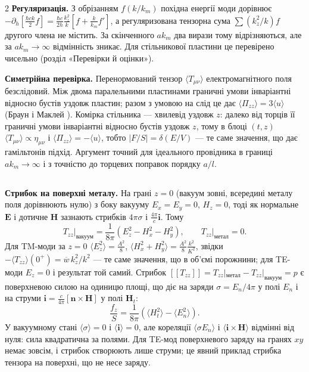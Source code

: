 \documentclass[twoside, 10pt]{article}
\def\myvspacebeforesubsection{-2.0mm}
\def\myvspaceaftersubsection{-2.5mm}
\begin{document}
\begin{multicols}{2}
\textbf{Регуляризація.} З обрізанням \(f(k/k_m)\) похідна енергії моди дорівнює
\(-\partial_h\!\left[\frac{\hbar ck}{2}f\right]=\frac{\hbar c}{2h}\frac{k_z^2}{k}\left[f+\frac{k}{k_m}f'\right]\),
а регуляризована тензорна сума \(\sum(k_z^2/k)f\) другого члена не містить. За скінченного
\(ak_m\) два вирази тому відрізняються, але за \(ak_m\to\infty\) відмінність зникає. Для
стільникової пластини це перевірено чисельно (розділ «Перевірки й оцінки»).

\textbf{Симетрійна перевірка.} Перенормований тензор \(\langle T_{\mu\nu}\rangle\)
електромагнітного поля безслідовий. Між двома паралельними пластинами граничні умови інваріантні
відносно бустів уздовж пластин; разом з умовою на слід це дає
\(\langle\Pi_{zz}\rangle=3\langle u\rangle\) (Браун і Маклей \cite{BrownMaclay1969}). Комірка
стільника --- хвилевід уздовж \(z\): далеко від торців її граничні умови інваріантні відносно
бустів уздовж \(z\), тому в блоці \((t,z)\) \(\langle T_{\mu\nu}\rangle\propto\eta_{\mu\nu}\) і
\(\langle\Pi_{zz}\rangle=-\langle u\rangle\), тобто \(|F/S|=\delta(E/V)\) --- те саме значення, що
дає гамільтонів підхід. Аргумент точний для ідеального провідника в границі \(ak_m\to\infty\) і з
точністю до торцевих поправок порядку \(a/l\).

\vspace{\myvspacebeforesubsection}
\subsection*{}
\vspace{\myvspaceaftersubsection}


\textbf{Стрибок на поверхні металу.} На грані \(z=0\) (вакуум зовні, всередині металу поля дорівнюють
нулю) з боку вакууму \(E_x=E_y=0\), \(H_z=0\), тоді як нормальне \(\mathbf E\) і дотичне
\(\mathbf H\) зазнають стрибків \(4\pi\sigma\) і \(\frac{4\pi}{c}\mathbf i\). Тому
\[
T_{zz}\big|_{\text{вакуум}}=\frac1{8\pi}\left(E_z^2-H_x^2-H_y^2\right),\qquad
T_{zz}\big|_{\text{метал}}=0 .
\]
Для TM-моди за \(z=0\) \(\langle E_z^2\rangle=\frac{A^2}{8}\),
\(\langle H_x^2+H_y^2\rangle=\frac{A^2}{8}\frac{k^2}{K^2}\), звідки
\(-\langle T_{zz}\rangle(0^+)=\overline w\,k_z^2/k^2\) --- те саме значення, що в об'ємі порожнини;
для TE-моди \(E_z=0\) і результат той самий. Стрибок
\([\![T_{zz}]\!]=T_{zz}|_{\text{метал}}-T_{zz}|_{\text{вакуум}}=p\) є поверхневою силою на одиницю
площі, що діє на заряди \(\sigma=E_n/4\pi\) у полі \(E_n\) і на струми
\(\mathbf i=\frac{c}{4\pi}[\mathbf n\times\mathbf H]\) у полі \(\mathbf H_t\):
\[
\frac{f_z}{S}=\frac1{8\pi}\left(\langle H_t^2\rangle-\langle E_n^2\rangle\right).
\]
У вакуумному стані \(\langle\sigma\rangle=0\) і \(\langle\mathbf i\rangle=0\), але кореляції
\(\langle\sigma E_n\rangle\) і \(\langle\mathbf i\times\mathbf H\rangle\) відмінні від нуля: сила
квадратична за полями. Для TE-мод поверхневого заряду на гранях \(xy\) немає зовсім, і стрибок
створюють лише струми; це явний приклад стрибка тензора на поверхні, що не несе заряду.


\end{multicols}
\end{document}

